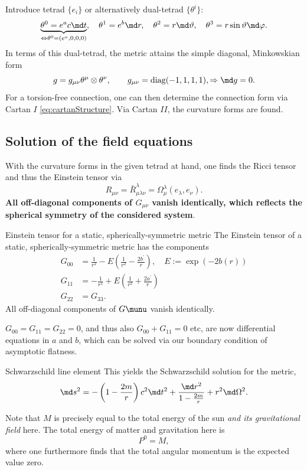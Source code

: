 Introduce tetrad $\{e_i\}$ or alternatively dual-tetrad $\{\theta^i\}$:
\begin{equation}
	\underbrace{\theta^0 = e^a c \md t }_{\Leftrightarrow \theta^0=(e^a,0,0,0)}, \quad \theta^1 = e^b \md r, \quad \theta^2=r \md \vartheta, \quad \theta^3=r \sin\vartheta \md \varphi.
\end{equation}
In terms of this dual-tetrad, the metric attains the simple diagonal, Minkowskian form
\begin{equation}
	g =g_{\mu \nu} \theta^{\mu} \otimes \theta^{\nu}, \qquad g_{\mu \nu} = \mathrm{diag}(-1,1,1,1), \Rightarrow \md g=0.
\end{equation}
For a torsion-free connection, one can then determine the connection form via Cartan $I$ \ref{eq:cartanStructure}. Via Cartan $II$, the curvature forms are found.
\subsection{Solution of the field equations}
With the curvature forms in the given tetrad at hand, one finds the Ricci tensor and thus the Einstein tensor via
\begin{equation}
	R_{\mu \nu} = \bar{R}^{\lambda}_{\mu \lambda \nu} = \Omega^{\lambda}_{\mu}(e_{\lambda}, e_{\nu}).
\end{equation}
\textbf{All off-diagonal components of $G_{\mu \nu}$ vanish identically, which reflects the spherical symmetry of the considered system}.\\
\begin{mybox}{Einstein tensor for a static, spherically-symmetric metric}
	The Einstein tensor of a static, spherically-symmetric metric has the
	components
	\begin{align}
		G_{00} &=\frac{1}{r^2} - E\left(\frac{1}{r^2} - \frac{2 b^\prime}{r}\right), \quad E:= \exp(-2b(r))\\
		G_{11} &=- \frac{1}{r^2}+ E\left(\frac{1}{r^2}+ \frac{2 a^\prime}{r}\right)\\
		G_{22} &= G_{33}.
	\end{align}
All off-diagonal components of $G\munu$ vanish identically.
\end{mybox}
$G_{00}=G_{11}=G_{22}=0$, and thus also $G_{00}+G_{11}=0$ etc, are now differential equations in $a$ and $b$, which can be solved via our boundary condition of asymptotic flatness.
\begin{mybox}{Schwarzschild line element}
	This yields the Schwarzschild solution for the metric,
	\begin{equation}
	\label{eq:Schwarzschildmetric}
		\md s^2 = -\left(1-\frac{2m}{r}\right) c^2 \md t^2 + \frac{\md r^2}{1-\frac{2m}{r}} + r^2 \md \Omega^2.
	\end{equation}
\end{mybox}
Note that $M$ is precisely equal to the total energy of the sun \emph{and its gravitational field} here. The total energy of matter and gravitation here is
\begin{equation}
	P^0 = M,
\end{equation}
where one furthermore finds that the total angular momentum is the expected value zero.

